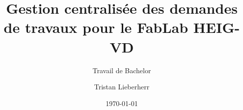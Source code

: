 \author{Tristan Lieberherr}


\title{Gestion centralisée des demandes de travaux pour le FabLab HEIG-VD}

\subtitle{Travail de Bachelor}


\date{\today}


